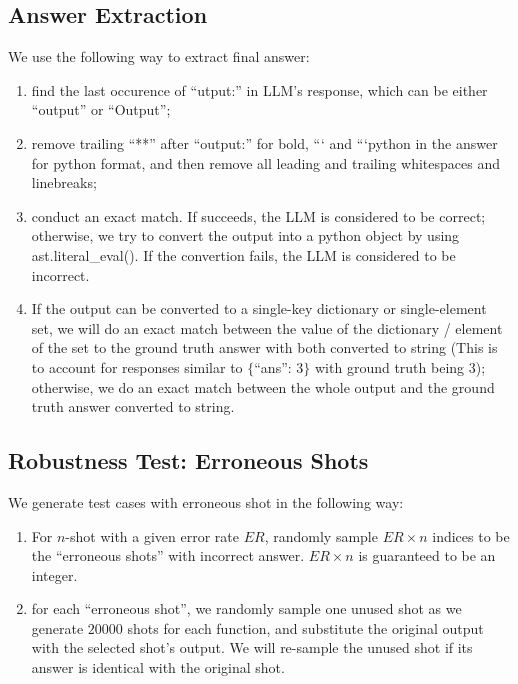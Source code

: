             


\subsection{Answer Extraction}
\label{sec:extract}
We use the following way to extract final answer:
\begin{enumerate}
    \item find the last occurence of ``utput:'' in LLM's response, which can be either ``output'' or ``Output'';
    \item remove trailing ``**'' after ``output:'' for bold, ``` and ```python in the answer for python format, and then remove all leading and trailing whitespaces and linebreaks;
    \item conduct an exact match. If succeeds, the LLM is considered to be correct; otherwise, we try to convert the output into a python object by using ast.literal\_eval(). If the convertion fails, the LLM is considered to be incorrect.
    \item If the output can be converted to a single-key dictionary or single-element set, we will do an exact match between the value of the dictionary / element of the set to the ground truth answer with both converted to string (This is to account for responses similar to $\{$``ans'': 3$\}$ with ground truth being 3); otherwise, we do an exact match between the whole output and the ground truth answer converted to string.  
\end{enumerate}

\subsection{Robustness Test: Erroneous Shots}
\label{sec:error_shots}
We generate test cases with erroneous shot in the following way:

\begin{enumerate}
    \item For $n$-shot with a given error rate $ER$, randomly sample $ER\times n$ indices to be the ``erroneous shots'' with incorrect answer. $ER\times n$ is guaranteed to be an integer.
    
    \item for each ``erroneous shot'', we randomly sample one unused shot as we generate $20000$ shots for each function, and substitute the original output with the selected shot's output. We will re-sample the unused shot if its answer is identical with the original shot.
    
\end{enumerate}

